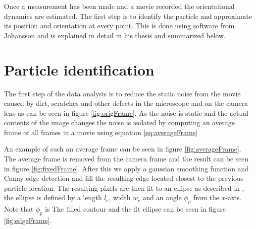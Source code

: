 \label{sec:dataanalysis}
Once a measurement has been made and a movie recorded the orientational dynamics are estimated. The first step is to identify the particle and approximate its position and orientation at every point. This is done using software from Johansson \cite{AntonThesis} and is explained in detail in his thesis and summarized below.

\section{Particle identification}\label{sec:particleidentification}

The first step of the data analysis is to reduce the static noise from the movie caused by dirt, scratches and other defects in the microscope and on the camera lens as can be seen in figure \ref{fig:origFrame}. As the noise is static and the actual contents of the image changes the noise is isolated by computing an average frame of all frames in a movie using equation \ref{eq:averageFrame}

An example of such an average frame can be seen in figure \ref{fig:averageFrame}. The average frame is removed from the camera frame and the result can be seen in figure \ref{fig:fixedFrame}. After this we apply a gaussian smoothing function and Canny edge detection \cite{Canny} and fill the resulting edge located closest to the previous particle location. The resulting pixels are then fit to an ellipse as described in \cite{AntonThesis, EllipseFit}, the ellipse is defined by a length $l_e$, width $w_e$ and an angle $\phi_p$ from the $x$-axis. Note that $\phi_p$ is The filled contour and the fit ellipse can be seen in figure 
\ref{fig:edgeFrame}.

